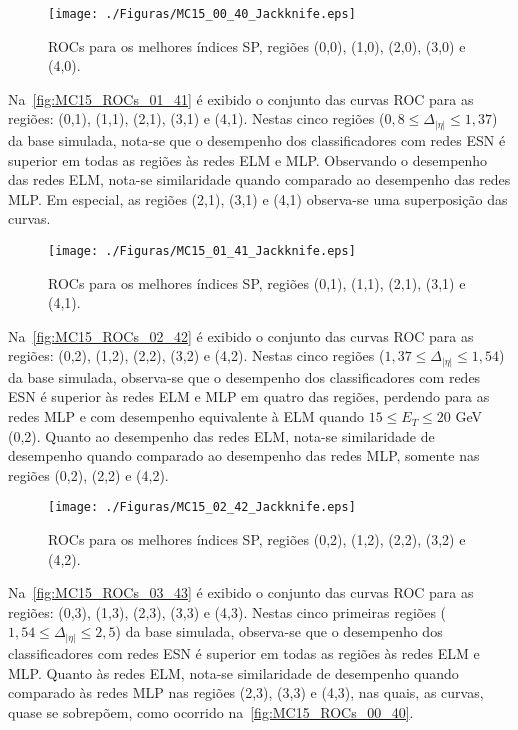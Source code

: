 \begin{figure}[H]
	\caption{ROCs para os melhores índices SP, regiões (0,0), (1,0), (2,0), (3,0) e (4,0).}
	\centerline{\texttt{[image: ./Figuras/MC15\_00\_40\_Jackknife.eps]}}
	\label{fig:MC15_ROCs_00_40}
\end{figure}

Na~\autoref{fig:MC15_ROCs_01_41} é exibido o conjunto das curvas ROC para as regiões: (0,1), (1,1), (2,1), (3,1) e (4,1). Nestas cinco regiões ($0,8\leq\Delta_{|\eta|}\leq1,37$) da base simulada, nota-se que o desempenho dos classificadores com redes ESN é superior em todas as regiões às redes ELM e MLP. Observando o desempenho das redes ELM, nota-se similaridade quando comparado ao desempenho das redes MLP. Em especial, as regiões (2,1), (3,1) e (4,1) observa-se uma superposição das curvas.

\begin{figure}[H]
	\caption{ROCs para os melhores índices SP, regiões (0,1), (1,1), (2,1), (3,1) e (4,1).}
	\centerline{\texttt{[image: ./Figuras/MC15\_01\_41\_Jackknife.eps]}}
	\label{fig:MC15_ROCs_01_41}
\end{figure}

Na~\autoref{fig:MC15_ROCs_02_42} é exibido o conjunto das curvas ROC para as regiões: (0,2), (1,2), (2,2), (3,2) e (4,2). Nestas cinco regiões ($1,37\leq\Delta_{|\eta|}\leq1,54$) da base simulada, observa-se que o desempenho dos classificadores com redes ESN é superior às redes ELM e MLP em quatro das regiões, perdendo para as redes MLP e com desempenho equivalente à ELM quando $15\leq E_T\leq20$ GeV (0,2). Quanto ao desempenho das redes ELM, nota-se similaridade de desempenho quando comparado ao desempenho das redes MLP, somente nas regiões (0,2), (2,2) e (4,2).

\begin{figure}[H]
	\caption{ROCs para os melhores índices SP, regiões (0,2), (1,2), (2,2), (3,2) e (4,2).}
	\centerline{\texttt{[image: ./Figuras/MC15\_02\_42\_Jackknife.eps]}}
	\label{fig:MC15_ROCs_02_42}
\end{figure}

Na~\autoref{fig:MC15_ROCs_03_43} é exibido o conjunto das curvas ROC para as regiões: (0,3), (1,3), (2,3), (3,3) e (4,3). Nestas cinco primeiras regiões ($1,54\leq\Delta_{|\eta|}\leq2,5$) da base simulada, observa-se que o desempenho dos classificadores com redes ESN é superior em todas as regiões às redes ELM e MLP. Quanto às redes ELM, nota-se similaridade de desempenho quando comparado às redes MLP nas regiões (2,3), (3,3) e (4,3), nas quais, as curvas, quase se sobrepõem, como ocorrido na~\autoref{fig:MC15_ROCs_00_40}.  

